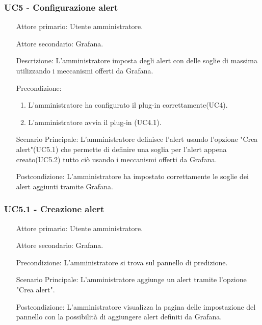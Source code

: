 \subsubsection{UC5 - Configurazione alert}
\label{sssec:uc5}
\begin{description}
	\begin{enumerate}
		\item[Attore primario:] Utente amministratore.
		\item[Attore secondario:] Grafana.
		\item[Descrizione:] L'amministratore imposta degli alert con delle soglie di massima utilizzando i meccanismi offerti da Grafana.
		\item[Precondizione:] 
		\begin{enumerate}
			\item L'amministratore ha configurato il plug-in correttamente(UC4).
			\item L'amministratore avvia il plug-in (UC4.1).
		\end {enumerate}
		\item[Scenario Principale:] L'amministratore definisce l'alert usando l'opzione "Crea alert"(UC5.1) che permette di definire una soglia per l'alert appena creato(UC5.2) tutto ciò usando i meccanismi offerti da Grafana.
		\item[Postcondizione:] L'amministratore ha impostato correttamente le soglie dei alert aggiunti tramite Grafana.
	\end{enumerate}
\end{description}

\subsubsection{UC5.1 - Creazione alert}
\label{sssec:uc5.1}
\begin{description}
	\begin{enumerate}
		\item[Attore primario:] Utente amministratore.
		\item[Attore secondario:] Grafana.
		\item[Precondizione:] L'amministratore si trova sul pannello di predizione.
		\item[Scenario Principale:] L'amministratore aggiunge un alert tramite l'opzione "Crea alert".
		\item[Postcondizione:] L'amministratore visualizza la pagina delle impostazione del pannello con la possibilità di aggiungere alert definiti da Grafana.
		\end{enumerate}
\end{description}

